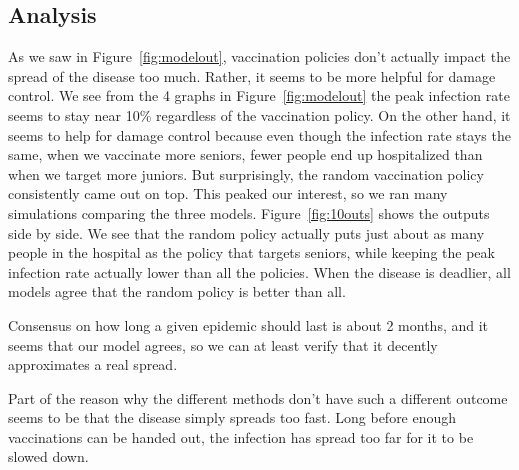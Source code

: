 \documentclass[titlepage]{article}
\begin{document}
\subsection{Analysis}
\par As we saw in Figure~\ref{fig:modelout}, vaccination policies don't actually impact the spread of the disease too much. Rather, it seems to be more helpful for damage control. We see from the 4 graphs in Figure~\ref{fig:modelout} the peak infection rate seems to stay near 10\% regardless of the vaccination policy. On the other hand, it seems to help for damage control because even though the infection rate stays the same, when we vaccinate more seniors, fewer people end up hospitalized than when we target more juniors. But surprisingly, the random vaccination policy consistently came out on top. This peaked our interest, so we ran many simulations comparing the three models. Figure~\ref{fig:10outs} shows the outputs side by side. We see that the random policy actually puts just about as many people in the hospital as the policy that targets seniors, while keeping the peak infection rate actually lower than all the policies. When the disease is deadlier, all models agree that the random policy is better than all.
\par Consensus on how long a given epidemic should last is about 2 months, and it seems that our model agrees, so we can at least verify that it decently approximates a real spread.
\par Part of the reason why the different methods don't have such a different outcome seems to be that the disease simply spreads too fast. Long before enough vaccinations can be handed out, the infection has spread too far for it to be slowed down.
\end{document}
